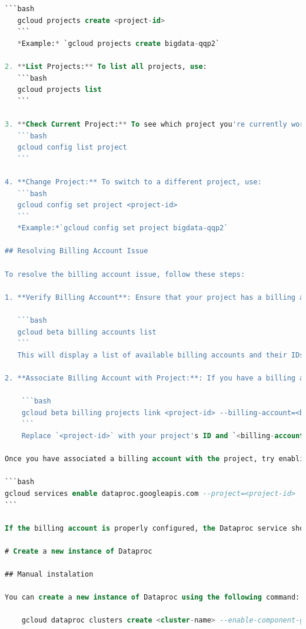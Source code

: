 \documentclass{article}
\begin{document}
\begin{lstlisting}[language=sql,caption={bash version}]
   ```bash
   gcloud projects create <project-id>
   ```
   *Example:* `gcloud projects create bigdata-qqp2`

2. **List Projects:** To list all projects, use:
   ```bash
   gcloud projects list
   ```

3. **Check Current Project:** To see which project you're currently working on, use:
   ```bash
   gcloud config list project
   ```

4. **Change Project:** To switch to a different project, use:
   ```bash
   gcloud config set project <project-id>
   ```
   *Example:*`gcloud config set project bigdata-qqp2`

## Resolving Billing Account Issue

To resolve the billing account issue, follow these steps:

1. **Verify Billing Account**: Ensure that your project has a billing account associated with it. You can do this by using the following command:

   ```bash
   gcloud beta billing accounts list
   ```
   This will display a list of available billing accounts and their IDs. If you don't have a billing account associated, you'll need to create one in the Google Cloud Billing console.

2. **Associate Billing Account with Project:**: If you have a billing account available, you can associate it with your project using the following command:

    ```bash
    gcloud beta billing projects link <project-id> --billing-account=<billing-account-id>
    ```
    Replace `<project-id>` with your project's ID and `<billing-account-id>` with the ID of the billing account you wish to associate.

Once you have associated a billing account with the project, try enabling the Dataproc service again using the following command:

```bash
gcloud services enable dataproc.googleapis.com --project=<project-id>
```

If the billing account is properly configured, the Dataproc service should be able to activate without any issues.

# Create a new instance of Dataproc

## Manual instalation

You can create a new instance of Dataproc using the following command:

    gcloud dataproc clusters create <cluster-name> --enable-component-gateway --region <region> --subnet default --master-machine-type e2-standard-4 --master-boot-disk-size 100 --num-workers 2 --worker-machine-type n2-standard-2 --worker-boot-disk-size 200 --image-version 2.2-ubuntu22 --optional-components JUPYTER,ZEPPELIN,DOCKER --scopes 'https://www.googleapis.com/auth/cloud-platform' --project <project-name>
    


\end{lstlisting}
\end{document}
